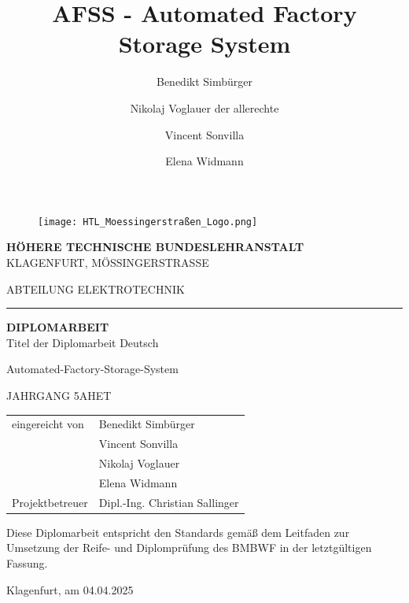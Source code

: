 \documentclass{article}
\title{AFSS - Automated Factory Storage System}
\author{Benedikt Simbürger \\
    \and Nikolaj Voglauer der allerechte \\
    \and Vincent Sonvilla \\
    \and Elena Widmann
    }
\begin{document}
\begin{figure}[h]
    \texttt{[image: HTL\_Moessingerstraßen\_Logo.png]}
    \centering
\end{figure}

\begin{center}
    \huge \textbf{HÖHERE TECHNISCHE BUNDESLEHRANSTALT} \\
    \vspace{5mm}
    \Large{KLAGENFURT, MÖSSINGERSTRASSE}

\end{center}

\vspace{7mm}

\begin{center}
    \Large{ABTEILUNG ELEKTROTECHNIK}
\end{center}

\hrule

\vspace{10mm}

\begin{center}
    \Huge \textbf{DIPLOMARBEIT} \\
    \vspace{7mm}
    \huge{Titel der Diplomarbeit Deutsch}

    \vspace{7mm}
    \huge{Automated-Factory-Storage-System}

    \vspace{7mm}
    \Large{JAHRGANG 5AHET}

\end{center}

\vspace{20mm}

\begin{flushleft}
    \bgroup
        \Large
        \def\arraystretch{1.5}
        \begin{tabular}{p{5cm}l}
            eingereicht von & Benedikt Simbürger\\
            & Vincent Sonvilla\\
            & Nikolaj Voglauer\\
            & Elena Widmann\\
            Projektbetreuer & Dipl.-Ing. Christian Sallinger
        \end{tabular}
    \egroup
\end{flushleft}
  
\vspace{7mm}
\Large
Diese Diplomarbeit entspricht den Standards gemäß dem Leitfaden zur Umsetzung der Reife- und Diplomprüfung des BMBWF in der letztgültigen Fassung.\par
\begin{flushright}
    Klagenfurt, am 04.04.2025
\end{flushright}
\end{document}
